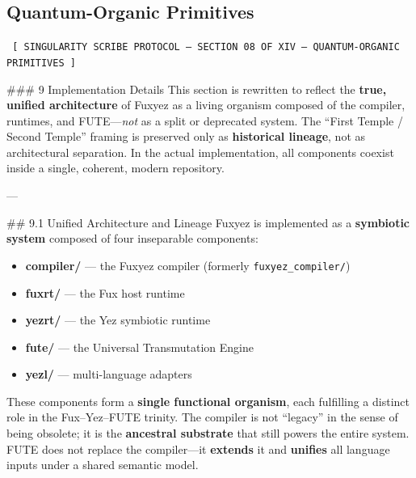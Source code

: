 \begin{enumerate}
    \chapter*{Quantum-Organic Primitives}
    
    
    \begin{glyphbox}
    \centering
    \color{neonCyan}\fontsize{8}{10}\selectfont\texttt{
    [ SINGULARITY SCRIBE PROTOCOL -- SECTION 08 OF XIV -- QUANTUM-ORGANIC PRIMITIVES ]
    }
    \end{glyphbox}
    \vspace{0.3cm}
    
    
    \#\#\# 9 Implementation Details  
This section is rewritten to reflect the \textbf{true, unified architecture} of Fuxyez as a living organism composed of the compiler, runtimes, and FUTE—\textit{not} as a split or deprecated system. The “First Temple / Second Temple” framing is preserved only as \textbf{historical lineage}, not as architectural separation. In the actual implementation, all components coexist inside a single, coherent, modern repository.

---

\#\# 9.1 Unified Architecture and Lineage  
Fuxyez is implemented as a \textbf{symbiotic system} composed of four inseparable components:

\begin{itemize}
  \item \textbf{compiler/} — the Fuxyez compiler (formerly \texttt{fuxyez_compiler/})  
  \item \textbf{fuxrt/} — the Fux host runtime  
  \item \textbf{yezrt/} — the Yez symbiotic runtime  
  \item \textbf{fute/} — the Universal Transmutation Engine  
  \item \textbf{yezl/} — multi-language adapters  
\end{itemize}

These components form a \textbf{single functional organism}, each fulfilling a distinct role in the Fux–Yez–FUTE trinity. The compiler is not “legacy” in the sense of being obsolete; it is the \textbf{ancestral substrate} that still powers the entire system. FUTE does not replace the compiler—it \textbf{extends} it and \textbf{unifies} all language inputs under a shared semantic model.


\end{enumerate}
